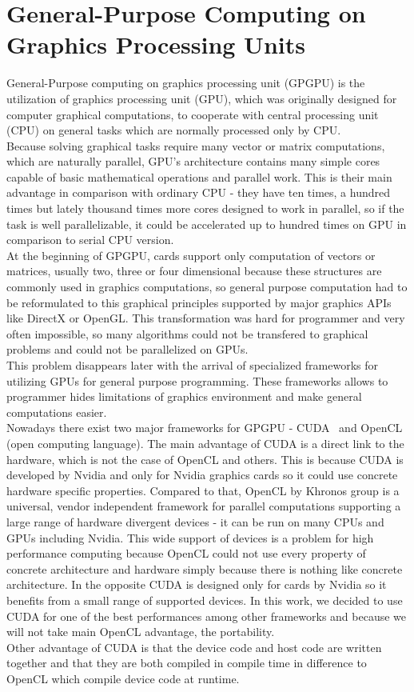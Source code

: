 \chapter{General-Purpose Computing on Graphics Processing Units}  \label{sec:gpgpu}
General-Purpose computing on graphics processing unit (GPGPU) is the utilization of graphics processing unit (GPU), which was originally designed for computer graphical computations, to cooperate with central processing unit (CPU) on general tasks which are normally processed only by CPU.\\
Because solving graphical tasks require many vector or matrix computations, which are naturally parallel, GPU's architecture contains many simple cores capable of basic mathematical operations and parallel work. This is their main advantage in comparison with ordinary CPU - they have ten times, a hundred times but lately thousand times more cores designed to work in parallel, so if the task is well parallelizable, it could be accelerated up to hundred times on GPU in comparison to serial CPU version.\\
At the beginning of GPGPU, cards support only computation of vectors or matrices, usually two, three or four dimensional because these structures are commonly used in graphics computations, so general purpose computation had to be reformulated to this graphical principles supported by major graphics APIs like DirectX or OpenGL. This transformation was hard for programmer and very often impossible, so many algorithms could not be transfered to graphical problems and could not be parallelized on GPUs.\\
This problem disappears later with the arrival of specialized frameworks for utilizing GPUs for general purpose programming. These frameworks allows to programmer hides limitations of graphics environment and make general computations easier.~\cite{Kirk12}\\
Nowadays there exist two major frameworks for GPGPU - CUDA~\cite{Sanders10} and OpenCL~\cite{Scarpino11} (open computing language). The main advantage of CUDA is a direct link to the hardware, which is not the case of OpenCL and others. This is because CUDA is developed by Nvidia and only for Nvidia graphics cards so it could use concrete hardware specific properties. Compared to that, OpenCL by Khronos group is a universal, vendor independent framework for parallel computations supporting a large range of hardware divergent devices - it can be run on many CPUs and GPUs including Nvidia. This wide support of devices is a problem for high performance computing because OpenCL could not use every property of concrete architecture and hardware simply because there is nothing like concrete architecture. In the opposite CUDA is designed only for cards by Nvidia so it benefits from a small range of supported devices. In this work, we decided to use CUDA for one of the best performances among other frameworks and because we will not take main OpenCL advantage, the portability.\\
Other advantage of CUDA is that the device code and host code are written together and that they are both compiled in compile time in difference to OpenCL which compile device code at runtime.

